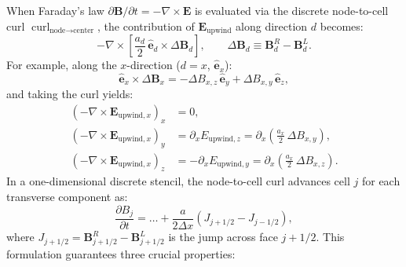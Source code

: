 \documentclass[a4paper, 11pt]{article}
\begin{document}
When Faraday's law $\partial \mathbf{B}/\partial t = -\nabla \times \mathbf{E}$ is evaluated via the discrete node-to-cell curl $\operatorname{curl}_{\text{node}\to\text{center}}$, the contribution of $\mathbf{E}_{\text{upwind}}$ along direction $d$ becomes:
\begin{equation}
-\nabla \times \left[ \frac{a_d}{2}\, \hat{\mathbf{e}}_d \times \Delta\mathbf{B}_d \right], \qquad \Delta\mathbf{B}_d \equiv \mathbf{B}^R_d - \mathbf{B}^L_d.
\end{equation}
For example, along the $x$-direction ($d=x$, $\hat{\mathbf{e}}_x$):
\begin{equation}
\hat{\mathbf{e}}_x \times \Delta\mathbf{B}_x = -\Delta B_{x,z}\,\hat{\mathbf{e}}_y + \Delta B_{x,y}\,\hat{\mathbf{e}}_z,
\end{equation}
and taking the curl yields:
\begin{align}
(-\nabla \times \mathbf{E}_{\text{upwind}, x})_x &= 0, \\
(-\nabla \times \mathbf{E}_{\text{upwind}, x})_y &= \partial_x E_{\text{upwind}, z} = \partial_x \left( \frac{a_x}{2}\,\Delta B_{x,y} \right), \\
(-\nabla \times \mathbf{E}_{\text{upwind}, x})_z &= -\partial_x E_{\text{upwind}, y} = \partial_x \left( \frac{a_x}{2}\,\Delta B_{x,z} \right).
\end{align}
In a one-dimensional discrete stencil, the node-to-cell curl advances cell $j$ for each transverse component as:
\begin{equation}
\frac{\partial B_j}{\partial t} = \dots + \frac{a}{2\Delta x} \left( J_{j+1/2} - J_{j-1/2} \right),
\end{equation}
where $J_{j+1/2} = \mathbf{B}^R_{j+1/2} - \mathbf{B}^L_{j+1/2}$ is the jump across face $j+1/2$. This formulation guarantees three crucial properties:
\end{document}
